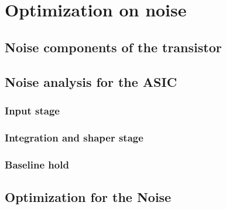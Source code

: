 \chapter{Optimization on noise}

\section{Noise components of the transistor}

\section{Noise analysis for the ASIC}
\subsection{Input stage}
\subsection{Integration and shaper stage}
\subsection{Baseline hold}

\section{Optimization for the Noise}

















